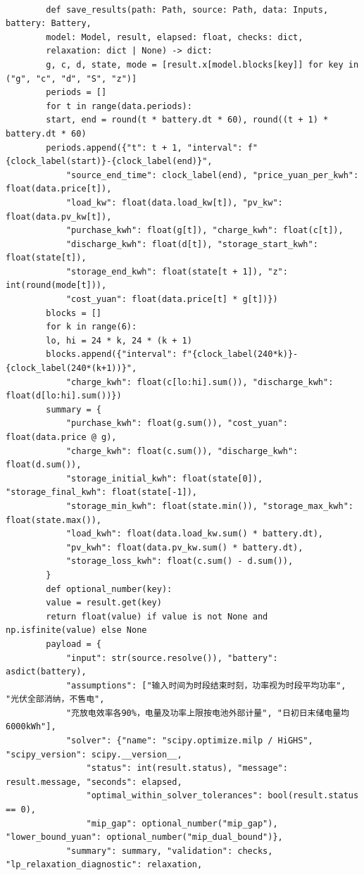\documentclass[UTF8]{ctexart}
\begin{document}
\begin{verbatim}
        
        def save_results(path: Path, source: Path, data: Inputs, battery: Battery,
        model: Model, result, elapsed: float, checks: dict,
        relaxation: dict | None) -> dict:
        g, c, d, state, mode = [result.x[model.blocks[key]] for key in ("g", "c", "d", "S", "z")]
        periods = []
        for t in range(data.periods):
        start, end = round(t * battery.dt * 60), round((t + 1) * battery.dt * 60)
        periods.append({"t": t + 1, "interval": f"{clock_label(start)}-{clock_label(end)}",
            "source_end_time": clock_label(end), "price_yuan_per_kwh": float(data.price[t]),
            "load_kw": float(data.load_kw[t]), "pv_kw": float(data.pv_kw[t]),
            "purchase_kwh": float(g[t]), "charge_kwh": float(c[t]),
            "discharge_kwh": float(d[t]), "storage_start_kwh": float(state[t]),
            "storage_end_kwh": float(state[t + 1]), "z": int(round(mode[t])),
            "cost_yuan": float(data.price[t] * g[t])})
        blocks = []
        for k in range(6):
        lo, hi = 24 * k, 24 * (k + 1)
        blocks.append({"interval": f"{clock_label(240*k)}-{clock_label(240*(k+1))}",
            "charge_kwh": float(c[lo:hi].sum()), "discharge_kwh": float(d[lo:hi].sum())})
        summary = {
            "purchase_kwh": float(g.sum()), "cost_yuan": float(data.price @ g),
            "charge_kwh": float(c.sum()), "discharge_kwh": float(d.sum()),
            "storage_initial_kwh": float(state[0]), "storage_final_kwh": float(state[-1]),
            "storage_min_kwh": float(state.min()), "storage_max_kwh": float(state.max()),
            "load_kwh": float(data.load_kw.sum() * battery.dt),
            "pv_kwh": float(data.pv_kw.sum() * battery.dt),
            "storage_loss_kwh": float(c.sum() - d.sum()),
        }
        def optional_number(key):
        value = result.get(key)
        return float(value) if value is not None and np.isfinite(value) else None
        payload = {
            "input": str(source.resolve()), "battery": asdict(battery),
            "assumptions": ["输入时间为时段结束时刻，功率视为时段平均功率", "光伏全部消纳，不售电",
            "充放电效率各90%，电量及功率上限按电池外部计量", "日初日末储电量均6000kWh"],
            "solver": {"name": "scipy.optimize.milp / HiGHS", "scipy_version": scipy.__version__,
                "status": int(result.status), "message": result.message, "seconds": elapsed,
                "optimal_within_solver_tolerances": bool(result.status == 0),
                "mip_gap": optional_number("mip_gap"), "lower_bound_yuan": optional_number("mip_dual_bound")},
            "summary": summary, "validation": checks, "lp_relaxation_diagnostic": relaxation,

\end{verbatim}
\end{document}
